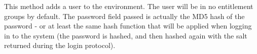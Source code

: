 This method adds a user to the \Rapture environment. The user will be in no entitlement groups by default. The password
field passed is actually the MD5 hash of the password - or at least the same hash function that will be applied when
logging in to the system (the password is hashed, and then hashed again with the salt returned during the login protocol).
